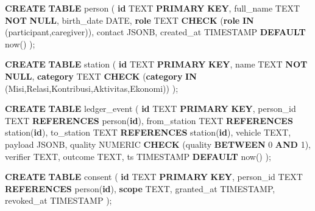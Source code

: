 \documentclass[
  letterpaper,
  DIV=11,
  numbers=noendperiod]{scrartcl}
\newenvironment{Shaded}{\begin{snugshade}}{\end{snugshade}}
\newcommand{\DataTypeTok}[1]{\textcolor[rgb]{0.68,0.00,0.00}{#1}}
\newcommand{\DecValTok}[1]{\textcolor[rgb]{0.68,0.00,0.00}{#1}}
\newcommand{\KeywordTok}[1]{\textcolor[rgb]{0.00,0.23,0.31}{\textbf{#1}}}
\newcommand{\NormalTok}[1]{\textcolor[rgb]{0.00,0.23,0.31}{#1}}
\newcommand{\StringTok}[1]{\textcolor[rgb]{0.13,0.47,0.30}{#1}}
\begin{document}
\begin{Shaded}
\begin{Highlighting}[]
\KeywordTok{CREATE} \KeywordTok{TABLE}\NormalTok{ person (}
  \KeywordTok{id}\NormalTok{ TEXT }\KeywordTok{PRIMARY} \KeywordTok{KEY}\NormalTok{,}
\NormalTok{  full\_name TEXT }\KeywordTok{NOT} \KeywordTok{NULL}\NormalTok{,}
\NormalTok{  birth\_date }\DataTypeTok{DATE}\NormalTok{,}
  \KeywordTok{role}\NormalTok{ TEXT }\KeywordTok{CHECK}\NormalTok{ (}\KeywordTok{role} \KeywordTok{IN}\NormalTok{ (}\StringTok{\textquotesingle{}participant\textquotesingle{}}\NormalTok{,}\StringTok{\textquotesingle{}caregiver\textquotesingle{}}\NormalTok{)),}
\NormalTok{  contact JSONB,}
\NormalTok{  created\_at }\DataTypeTok{TIMESTAMP} \KeywordTok{DEFAULT}\NormalTok{ now()}
\NormalTok{);}

\KeywordTok{CREATE} \KeywordTok{TABLE}\NormalTok{ station (}
  \KeywordTok{id}\NormalTok{ TEXT }\KeywordTok{PRIMARY} \KeywordTok{KEY}\NormalTok{,}
\NormalTok{  name TEXT }\KeywordTok{NOT} \KeywordTok{NULL}\NormalTok{,}
  \KeywordTok{category}\NormalTok{ TEXT }\KeywordTok{CHECK}\NormalTok{ (}\KeywordTok{category} \KeywordTok{IN}\NormalTok{ (}\StringTok{\textquotesingle{}Misi\textquotesingle{}}\NormalTok{,}\StringTok{\textquotesingle{}Relasi\textquotesingle{}}\NormalTok{,}\StringTok{\textquotesingle{}Kontribusi\textquotesingle{}}\NormalTok{,}\StringTok{\textquotesingle{}Aktivitas\textquotesingle{}}\NormalTok{,}\StringTok{\textquotesingle{}Ekonomi\textquotesingle{}}\NormalTok{))}
\NormalTok{);}

\KeywordTok{CREATE} \KeywordTok{TABLE}\NormalTok{ ledger\_event (}
  \KeywordTok{id}\NormalTok{ TEXT }\KeywordTok{PRIMARY} \KeywordTok{KEY}\NormalTok{,}
\NormalTok{  person\_id TEXT }\KeywordTok{REFERENCES}\NormalTok{ person(}\KeywordTok{id}\NormalTok{),}
\NormalTok{  from\_station TEXT }\KeywordTok{REFERENCES}\NormalTok{ station(}\KeywordTok{id}\NormalTok{),}
\NormalTok{  to\_station TEXT }\KeywordTok{REFERENCES}\NormalTok{ station(}\KeywordTok{id}\NormalTok{),}
\NormalTok{  vehicle TEXT,}
\NormalTok{  payload JSONB,}
\NormalTok{  quality }\DataTypeTok{NUMERIC} \KeywordTok{CHECK}\NormalTok{ (quality }\KeywordTok{BETWEEN} \DecValTok{0} \KeywordTok{AND} \DecValTok{1}\NormalTok{),}
\NormalTok{  verifier TEXT,}
\NormalTok{  outcome TEXT,}
\NormalTok{  ts }\DataTypeTok{TIMESTAMP} \KeywordTok{DEFAULT}\NormalTok{ now()}
\NormalTok{);}

\KeywordTok{CREATE} \KeywordTok{TABLE}\NormalTok{ consent (}
  \KeywordTok{id}\NormalTok{ TEXT }\KeywordTok{PRIMARY} \KeywordTok{KEY}\NormalTok{,}
\NormalTok{  person\_id TEXT }\KeywordTok{REFERENCES}\NormalTok{ person(}\KeywordTok{id}\NormalTok{),}
  \KeywordTok{scope}\NormalTok{ TEXT,}
\NormalTok{  granted\_at }\DataTypeTok{TIMESTAMP}\NormalTok{,}
\NormalTok{  revoked\_at }\DataTypeTok{TIMESTAMP}
\NormalTok{);}


\end{Highlighting}
\end{Shaded}
\end{document}
